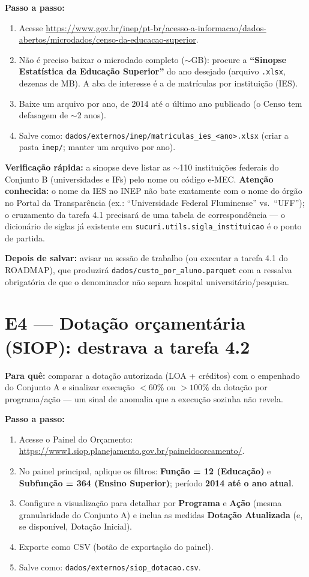\documentclass[11pt,a4paper]{article}
\begin{document}
\textbf{Passo a passo:}
\begin{enumerate}
    \item Acesse
    \url{https://www.gov.br/inep/pt-br/acesso-a-informacao/dados-abertos/microdados/censo-da-educacao-superior}.
    \item Não é preciso baixar o microdado completo ($\sim$GB): procure a
    \textbf{``Sinopse Estatística da Educação Superior''} do ano desejado
    (arquivo \texttt{.xlsx}, dezenas de MB). A aba de interesse é a de
    matrículas por instituição (IES).
    \item Baixe um arquivo por ano, de 2014 até o último ano publicado
    (o Censo tem defasagem de $\sim$2 anos).
    \item Salve como:
    \texttt{dados/externos/inep/matriculas\_ies\_<ano>.xlsx}
    (criar a pasta \texttt{inep/}; manter um arquivo por ano).
\end{enumerate}

\textbf{Verificação rápida:} a sinopse deve listar as $\sim$110
instituições federais do Conjunto B (universidades e IFs) pelo nome ou
código e-MEC. \textbf{Atenção conhecida:} o nome da IES no INEP não bate
exatamente com o nome do órgão no Portal da Transparência (ex.:
``Universidade Federal Fluminense'' vs.\ ``UFF''); o cruzamento da tarefa
4.1 precisará de uma tabela de correspondência --- o dicionário de siglas
já existente em \texttt{sucuri.utils.sigla\_instituicao} é o ponto de
partida.

\textbf{Depois de salvar:} avisar na sessão de trabalho (ou executar a
tarefa 4.1 do ROADMAP), que produzirá
\texttt{dados/custo\_por\_aluno.parquet} com a ressalva obrigatória de que
o denominador não separa hospital universitário/pesquisa.

\section{E4 --- Dotação orçamentária (SIOP): destrava a tarefa 4.2}

\textbf{Para quê:} comparar a dotação autorizada (LOA + créditos) com o
empenhado do Conjunto A e sinalizar execução $<60\%$ ou $>100\%$ da
dotação por programa/ação --- um sinal de anomalia que a execução sozinha
não revela.

\textbf{Passo a passo:}
\begin{enumerate}
    \item Acesse o Painel do Orçamento:
    \url{https://www1.siop.planejamento.gov.br/paineldoorcamento/}.
    \item No painel principal, aplique os filtros: \textbf{Função = 12
    (Educação)} e \textbf{Subfunção = 364 (Ensino Superior)}; período
    \textbf{2014 até o ano atual}.
    \item Configure a visualização para detalhar por \textbf{Programa} e
    \textbf{Ação} (mesma granularidade do Conjunto A) e inclua as medidas
    \textbf{Dotação Atualizada} (e, se disponível, Dotação Inicial).
    \item Exporte como CSV (botão de exportação do painel).
    \item Salve como: \texttt{dados/externos/siop\_dotacao.csv}.
\end{enumerate}
\end{document}
